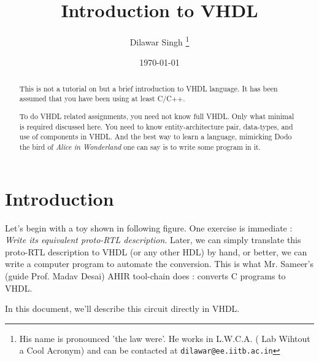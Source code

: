 \documentclass[a4paper,10pt]{article}
\title{Introduction to VHDL}
\author{Dilawar Singh \footnote{His name is pronounced 'the law were'. He works in L.W.C.A. ( Lab Wihtout a Cool Acronym) and
can be contacted at \texttt{dilawar@ee.iitb.ac.in}}}
\date{\today}
\begin{document}
\maketitle

\begin{abstract}
  
  This is not a tutorial on but a brief introduction to VHDL language. It has
  been assumed that you have been using at least C/C++. 
  
  To do VHDL related assignments, you need not know full VHDL.  Only what 
  minimal is required discussed here. You need to know entity-architecture
  pair, data-types, and use of components in VHDL. And the best way to learn a
  language, mimicking Dodo the bird of \emph{Alice in Wonderland} one can say is
  to write some program in it. 

\end{abstract}

\section{Introduction}
  
 Let's begin with a toy shown in following figure. One exercise is immediate :
 \emph{Write its equivalent proto-RTL description}. Later, we can simply
 translate this proto-RTL description to VHDL (or any other HDL) by hand, or
 better, we can write a computer program to automate the conversion. This is
 what Mr. Sameer's (guide Prof. Madav Desai) AHIR tool-chain does : converts C
 programs to VHDL.

 In this document, we'll describe this circuit directly in VHDL.
 
\end{document}
